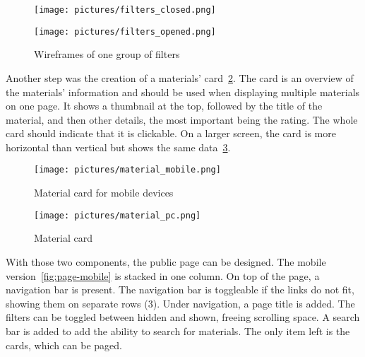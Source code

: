\documentclass[
  digital,     %
  oneside,     %
  nosansbold,  %
  colorbold, %
  lof,         %
  lot,         %
]{fithesis4}
\begin{document}
\begin{figure}[!htbp]
	\begin{center}
		\begin{minipage}{.3\textwidth}
			\texttt{[image: pictures/filters\_closed.png]}
		\end{minipage}
		\begin{minipage}{.3\textwidth}
			\texttt{[image: pictures/filters\_opened.png]}
		\end{minipage}
	\end{center}
	\caption{Wireframes of one group of filters}
	\label{fig:filters}
\end{figure}

Another step was the creation of a materials' card~\ref{fig:mat-card-mobile}. The card is an overview of the materials' information and should be used when displaying multiple materials on one page. It shows a thumbnail at the top, followed by the title of the material, and then other details, the most important being the rating. The whole card should indicate that it is clickable. On a larger screen, the card is more horizontal than vertical but shows the same data~\ref{fig:mat-card-pc}.

\begin{figure}[!htbp]
	\begin{center}
		\begin{minipage}{.35\textwidth}
			\texttt{[image: pictures/material\_mobile.png]}
		\end{minipage}
	\end{center}
	\caption{Material card for mobile devices}
	\label{fig:mat-card-mobile}
\end{figure}

\begin{figure}
	\begin{center}
		\begin{minipage}{1\textwidth}
			\texttt{[image: pictures/material\_pc.png]}
		\end{minipage}
	\end{center}
	\caption{Material card}
	\label{fig:mat-card-pc}
\end{figure}

With those two components, the public page can be designed. The mobile version~\ref{fig:page-mobile} is stacked in one column. On top of the page, a navigation bar is present. The navigation bar is toggleable if the links do not fit, showing them on separate rows (3). Under navigation, a page title is added. The filters can be toggled between hidden and shown, freeing scrolling space. A search bar is added to add the ability to search for materials. The only item left is the cards, which can be paged.
\end{document}
